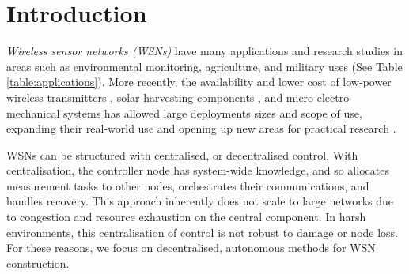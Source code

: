 \section{Introduction}

\textit{Wireless sensor networks (WSNs)} have many applications and research studies in areas such as environmental monitoring, agriculture, and military uses (See Table \ref{table:applications}). More recently, the availability and lower cost of low-power wireless transmitters \citep{902661}, solar-harvesting components \citep{Prauzek2018}, and micro-electro-mechanical systems \citep{1045391} has allowed large deployments sizes and scope of use, expanding their real-world use and opening up new areas for practical research \citep{5597912, Kandris2020}.

WSNs can be structured with centralised, or decentralised control. With centralisation, the controller node has system-wide knowledge, and so allocates measurement tasks to other nodes, orchestrates their communications, and handles recovery. This approach inherently does not scale to large networks due to congestion and resource exhaustion on the central component. In harsh environments, this centralisation of control is not robust to damage or node loss. For these reasons, we focus on decentralised, autonomous methods for WSN construction.

